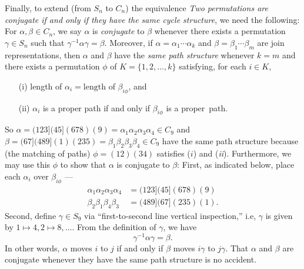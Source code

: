 \documentclass{surv-l}
\numberwithin{equation}{section}
\numberwithin{table}{section}
\numberwithin{figure}{section}
\theoremstyle{definition}
\begin{document}
Finally, to extend (from $S_{n}$ to $C_{n}$) the equivalence \emph{Two permutations are conjugate if
and only if they have the same cycle structure}, we need the
following: For $\alpha,\beta\in C_{n}$, we say $\alpha$ is
\emph{conjugate} to $\beta$ whenever there exists a permutation
$\gamma\in S_{n}$ such that $\gamma^{-1}\alpha\gamma=\beta$.
Moreover, if $\alpha=\alpha_{1}\cdots\alpha_{k}$ and
$\beta=\beta_{1}\cdots\beta_{m}$ are join representations, then
$\alpha$ and $\beta$ have the \emph{same path structure} whenever
$k=m$ and there exists a permutation $\phi$ of $K= \{1,2,\ldots,
k\}$ satisfying, for each $i\in K$,
\begin{enumerate}
\item[(i)] length of $\alpha_{i}= \mathrm{length}$ of $\beta_{i\phi}$, and

\item[(ii)] $\alpha_{i}$ is a proper path if and only if $\beta_{i\phi}$
is a proper~path.
\end{enumerate}
So
$\alpha=(123](45](678)(9)=\alpha_{1}\alpha_{2}\alpha_{3}\alpha_{4}\in
C_{9}$ and $\beta=(67](489](1)(235)=
\beta_{1}\beta_{2}\beta_{3}\beta_{4}\in C_{9}$ have the same path
structure because (the matching of paths) $\phi =(12)(34)$
satisfies ($i$) and (\emph{ii}). Furthermore, we may use this
$\phi$ to show that $\alpha$ is conjugate to $\beta$: First, as
indicated below, place each $\alpha_{i}$ over $\beta_{i\phi}$ ---
\begin{align*}
\alpha_{1}\alpha_{2}\alpha_{3}\alpha_{4}&=(123](45](678)(9) \\
\beta_{2}\beta_{1}\beta_{4}\beta_{3}&=(489](67](235)(1).
\end{align*}
Second, define $\gamma\in S_{9}$ via ``first-to-second line
vertical inspection,'' i.e, $\gamma$ is given by $1\mapsto
4,2\mapsto 8,\ldots.$ From the definition of $\gamma$, we have
\[
\gamma^{-1}\alpha\gamma=\beta.
\]
In other words, $\alpha$ moves $i$ to $j$ if and only if $\beta$
moves $i\gamma$ to $j\gamma$. That $\alpha$ and $\beta$ are
conjugate whenever they have the same path structure is no
accident.
\end{document}
